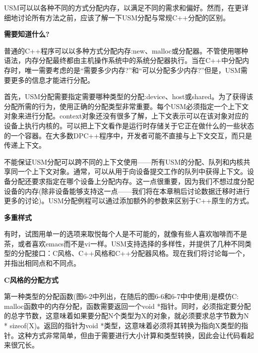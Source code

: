 USM可以以各种不同的方式分配内存，以满足不同的需求和偏好。然而，在更详细地讨论所有方法之前，应该了解一下USM分配与常规C++分配的区别。\par

\hspace*{\fill} \par %
\textbf{需要知道什么?}

普通的C++程序可以以多种方式分配内存:new、malloc或分配器。不管使用哪种语法，内存分配最终都由主机操作系统中的系统分配器执行。当在C++中分配内存时，唯一需要考虑的是“需要多少内存?”和“可以分配多少内存?”但是，USM需要更多的信息才能进行分配。\par

首先，USM分配需要指定需要哪种类型的分配:device、host或shared。为了获得该分配所需的行为，使用正确的分配类型非常重要。每个USM必须指定一个上下文对象来进行分配。context对象还没有很多了解，上下文表示可以在该对象对应的设备上执行内核的。可以把上下文看作是运行时存储关于它正在做什么的一些状态的一个容器。在大多数DPC++程序中，开发者可能不直接与上下文交互，而只是传递上下文。\par

不能保证USM分配可以跨不同的上下文使用——所有USM的分配、队列和内核共享同一个上下文对象。通常，可以从用于向设备提交工作的队列中获得上下文。设备分配还要求指定在哪个设备上分配内存。这一点很重要，因为我们不想过度分配设备的内存(除非设备能够支持这一点——我们将在本章稍后讨论数据迁移时进行更多的讨论)。USM分配例程可以通过添加额外的参数来区别于C++原生的方式。\par

\hspace*{\fill} \par %
\textbf{多重样式}

有时，试图用单一的选项来取悦每个人是不可能的，就像有些人喜欢咖啡而不是茶，或者喜欢emacs而不是vi一样。USM支持选择的多样性，并提供了几种不同类型的分配接口：C风格、C++风格和C++分配器风格。现在我们将讨论每一个，并指出相同点和不同点。\par

\hspace*{\fill} \par %
\textbf{C风格的分配方式}

第一种类型的分配函数(图6-2中列出，在随后的图6-6和6-7中中使用)是模仿C: malloc函数中的内存分配，函数需要返回一个void *指针。同时，必须指定要分配的总字节数，这意味着如果要分配N个类型为X的对象，就必须要求总字节数为N * sizeof(X)。返回的指针为void *类型，这意味着必须将其转换为指向X类型的指针。这种方式非常简单，但由于需要进行大小计算和类型转换，因此会让代码看起来很冗长。\par

